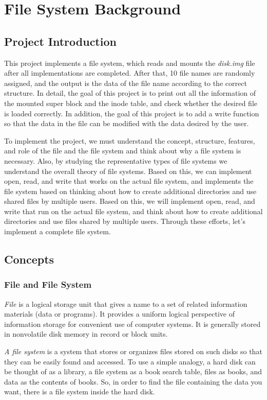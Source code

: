 \documentclass{homework}
\begin{document}
\pagebreak
\section{File System Background}
\subsection{Project Introduction}
This project implements a file system, which reads and mounts the \textit{disk.img} file after all implementations are completed. After that, 10 file names are randomly assigned, and the output is the data of the file name according to the correct structure. In detail, the goal of this project is to print out all the information of the mounted super block and the inode table, and check whether the desired file is loaded correctly. In addition, the goal of this project is to add a write function so that the data in the file can be modified with the data desired by the user.

To implement the project, we must understand the concept, structure, features, and role of the file and the file system and think about why a file system is necessary. Also, by studying the representative types of file systems we understand the overall theory of file systems. Based on this, we can implement open, read, and write that works on the actual file system, and implements the file system based on thinking about how to create additional directories and use shared files by multiple users. Based on this, we will implement open, read, and write that run on the actual file system, and think about how to create additional directories and use files shared by multiple users. Through these efforts, let's implement a complete file system.

\subsection{Concepts}
\subsubsection{File and File System}
\textit{File} is a logical storage unit that gives a name to a set of related information materials (data or programs). It provides a uniform logical perspective of information storage for convenient use of computer systems. It is generally stored in nonvolatile disk memory in record or block units.

\textit{A file system} is a system that stores or organizes files stored on such disks so that they can be easily found and accessed.
To use a simple analogy, a hard disk can be thought of as a library, a file system as a book search table, files as books, and data as the contents of books. So, in order to find the file containing the data you want, there is a file system inside the hard disk.
\end{document}
